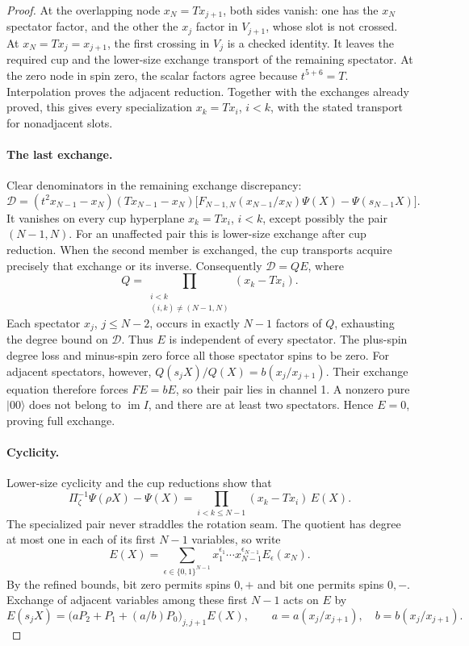\begin{proof}
At the overlapping node \(x_N=Tx_{j+1}\), both sides vanish: one
has the \(x_N\) spectator factor, and the other the \(x_j\) factor
in \(V_{j+1}\), whose slot is not crossed. At
\(x_N=Tx_j=x_{j+1}\), the first crossing in \(V_j\) is a checked
identity. It leaves the required cup and the lower-size exchange
transport of the remaining spectator. At the zero node in spin zero,
the scalar factors agree because \(t^{5+6}=T\). Interpolation proves
the adjacent reduction. Together with the exchanges already proved,
this gives every specialization \(x_k=Tx_i\), \(i<k\), with the
stated transport for nonadjacent slots.

\paragraph{The last exchange.}
Clear denominators in the remaining exchange discrepancy:
\[
 \mathcal D=(t^2x_{N-1}-x_N)(Tx_{N-1}-x_N)
 \big[F_{N-1,N}(x_{N-1}/x_N)\Psi(X)-\Psi(s_{N-1}X)\big].
\]
It vanishes on every cup hyperplane \(x_k=Tx_i\), \(i<k\), except
possibly the pair \((N-1,N)\). For an unaffected pair this is lower-size
exchange after cup reduction. When the second member is exchanged,
the cup transports acquire precisely that exchange or its inverse.
Consequently \(\mathcal D=Q E\), where
\[
 Q=\prod_{\substack{i<k\\(i,k)\ne(N-1,N)}}(x_k-Tx_i).
\]
Each spectator \(x_j\), \(j\le N-2\), occurs in exactly \(N-1\)
factors of \(Q\), exhausting the degree bound on \(\mathcal D\).
Thus \(E\) is independent of every spectator. The plus-spin degree
loss and minus-spin zero force all those spectator spins to be zero.
For adjacent spectators, however,
\(Q(s_jX)/Q(X)=b(x_j/x_{j+1})\). Their exchange equation therefore
forces \(F E=b E\), so their pair lies in channel 1. A nonzero pure
\(|00\rangle\) does not belong to \(\operatorname{im}I\), and there
are at least two spectators. Hence \(E=0\), proving full exchange.

\paragraph{Cyclicity.}
Lower-size cyclicity and the cup reductions show that
\[
 \Pi_\zeta^{-1}\Psi(\rho X)-\Psi(X)
 =\prod_{i<k\le N-1}(x_k-Tx_i)\,E(X).
\]
The specialized pair never straddles the rotation seam. The quotient
has degree at most one in each of its first \(N-1\) variables, so write
\[
 E(X)=\sum_{\epsilon\in\{0,1\}^{N-1}}
 x_1^{\epsilon_1}\cdots x_{N-1}^{\epsilon_{N-1}}
 E_\epsilon(x_N).
\]
By the refined bounds, bit zero permits spins \(0,+\) and bit one
permits spins \(0,-\). Exchange of adjacent variables among these
first \(N-1\) acts on \(E\) by
\[
 E(s_jX)=\big(aP_2+P_1+(a/b)P_0\big)_{j,j+1}E(X),
 \qquad a=a(x_j/x_{j+1}),\quad b=b(x_j/x_{j+1}).
\]


\end{proof}
